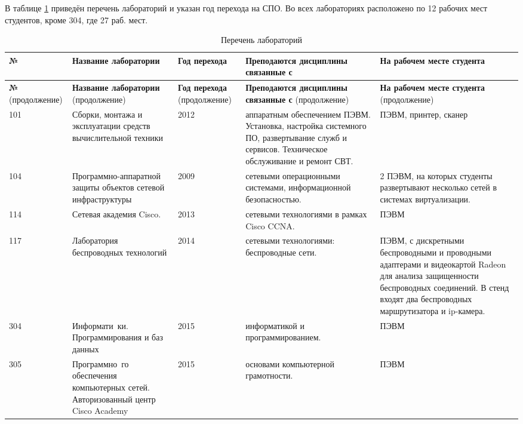 \documentclass[10pt, a5paper]{article}
\begin{document}
В таблице \ref{Uymin1} приведён перечень лабораторий и указан год перехода на СПО. Во всех лабораториях расположено по 12 рабочих мест студентов, кроме 304, где 27 раб. мест.


\begin{longtable}[h!]{|p{0.7cm}|p{2cm}|p{1cm}|p{2.5cm}|p{2.5cm}|}
\caption{Перечень лабораторий} \label{Uymin1} \\
\hline

\textbf{№} & \textbf{Название лаборатории} & \textbf{Год перехода} & \textbf{Преподаются дисциплины связанные с} & \textbf{На рабочем месте студента} \\
\hline
\endfirsthead %

\hline
\textbf{№} (продолжение) & \textbf{Название лаборатории} (продолжение) & \textbf{Год перехода} (продолжение) & \textbf{Преподаются дисциплины связанные с} (продолжение) & \textbf{На рабочем месте студента} (продолжение) \\
\hline
\endhead %

 101 & Сборки, монтажа и эксплуатации средств вычислительной техники &  2012 & аппаратным обеспечением ПЭВМ. Установка, настройка системного ПО, развертывание служб и сервисов. Техническое обслуживание и ремонт СВТ. & ПЭВМ, принтер, сканер \\ 
\hline 
 104 & Программно-аппаратной защиты объектов сетевой инфраструктуры & 2009 & сетевыми операционными системами, информационной безопасностью. &  2 ПЭВМ, на которых студенты развертывают несколько сетей в системах виртуализации. \\ 
\hline 
 114 & Сетевая академия Cisco. & 2013 & сетевыми технологиями в рамках Cisco CCNA. &  ПЭВМ \\ 
\hline 
 117 & Лаборатория беспроводных технологий & 2014 & сетевыми технологиями: беспроводные сети. & ПЭВМ, с дискретными беспроводными и проводными адаптерами и видеокартой Radeon для анализа защищенности беспроводных соединений. В стенд входят два беспроводных маршрутизатора и ip-камера. \\
\hline 
 304 & Информати~\-ки. Программирования и баз данных &  2015 & информатикой и программированием. & ПЭВМ \\ 
\hline 
 305 & Программно~\-го обеспечения компьютерных сетей. Авторизованный центр Cisco Academy & 2015 & основами компьютерной грамотности. & ПЭВМ
\hline 

\end{longtable}
\end{document}
